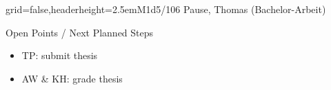 \documentclass[english]{kiesgrube}
\begin{document}
\begin{poster}{grid=false,headerheight=2.5em}{}{M1d5/106 Pause, Thomas (Bachelor-Arbeit)}{}{}
\begin{posterbox}[name=open,column=1,below=description]{Open Points / Next Planned Steps}
\begin{itemize}
\item TP: submit thesis
\item AW \& KH: grade thesis
\end{itemize}
\end{posterbox}
\footer{}
\end{poster}

\newpage
\end{document}
